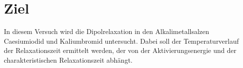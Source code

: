 \section{Ziel}
\label{sec:Ziel}
In diesem Versuch wird die Dipolrelaxation in den Alkalimetallsalzen Caesiumiodid und Kaliumbromid untersucht. Dabei soll der Temperaturverlauf der Relaxationszeit ermittelt werden, der von der Aktivierungsenergie und der charakteristischen Relaxationszeit abhängt.
